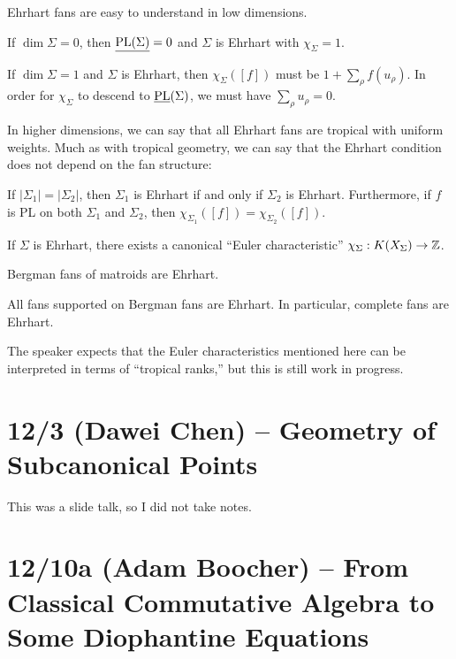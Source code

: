 \documentclass{amsart}
\begin{document}
Ehrhart fans are easy to understand in low dimensions.

\begin{ex}
	If $\dim \Sigma = 0$, then $\underline{\operatorname{PL}(\Sigma)} = 0$ and $\Sigma$ is Ehrhart with $\chi_\Sigma = 1$.
\end{ex}

\begin{ex}
	If $\dim \Sigma = 1$ and $\Sigma$ is Ehrhart, then $\chi_\Sigma([f])$ must be $1 + \sum_\rho f(u_\rho)$.
	In order for $\chi_\Sigma$ to descend to $\underline{\operatorname{PL}}(\Sigma)$, we must have $\sum_\rho u_\rho = 0$.
\end{ex}

In higher dimensions, we can say that all Ehrhart fans are tropical with uniform weights.
Much as with tropical geometry, we can say that the Ehrhart condition does not depend on the fan structure:

\begin{thm}[CCKR]
	If $|\Sigma_1| = |\Sigma_2|$, then $\Sigma_1$ is Ehrhart if and only if $\Sigma_2$ is Ehrhart.
	Furthermore, if $f$ is PL on both $\Sigma_1$ and $\Sigma_2$, then $\chi_{\Sigma_1}([f]) = \chi_{\Sigma_2}([f])$.
\end{thm}

\begin{cor}
	If $\Sigma$ is Ehrhart, there exists a canonical ``Euler characteristic'' $\chi_\Sigma: K(X_\Sigma) \to \mathbb{Z}$.
\end{cor}

\begin{thm}
	Bergman fans of matroids are Ehrhart.
\end{thm}

\begin{cor}
	All fans supported on Bergman fans are Ehrhart.
	In particular, complete fans are Ehrhart.
\end{cor}

The speaker expects that the Euler characteristics mentioned here can be interpreted in terms of ``tropical ranks,'' but this is still work in progress.

\section{12/3 (Dawei Chen) -- Geometry of Subcanonical Points}

This was a slide talk, so I did not take notes.

\section{12/10a (Adam Boocher) -- From Classical Commutative Algebra to Some Diophantine Equations}
\end{document}
